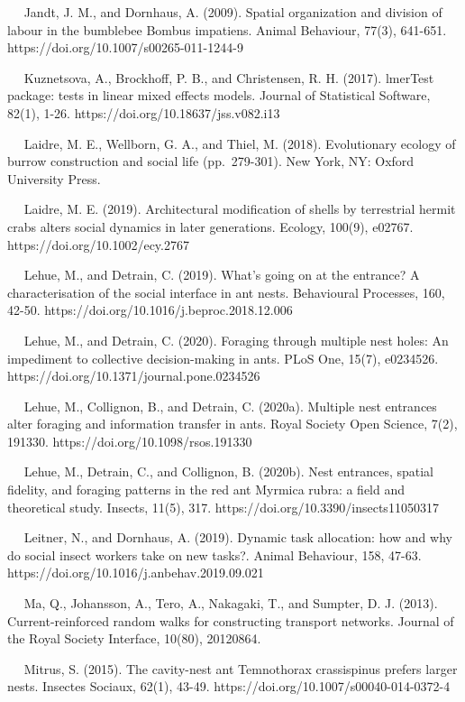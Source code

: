 \documentclass[3p]{elsarticle} %
\begin{document}
~~ Jandt, J. M., and Dornhaus, A. (2009). Spatial organization and
division of labour in the bumblebee Bombus impatiens. Animal Behaviour,
77(3), 641-651. https://doi.org/10.1007/s00265-011-1244-9

~~ Kuznetsova, A., Brockhoff, P. B., and Christensen, R. H. (2017).
lmerTest package: tests in linear mixed effects models. Journal of
Statistical Software, 82(1), 1-26. https://doi.org/10.18637/jss.v082.i13

~~ Laidre, M. E., Wellborn, G. A., and Thiel, M. (2018). Evolutionary
ecology of burrow construction and social life (pp.~279-301). New York,
NY: Oxford University Press.

~~ Laidre, M. E. (2019). Architectural modification of shells by
terrestrial hermit crabs alters social dynamics in later generations.
Ecology, 100(9), e02767. https://doi.org/10.1002/ecy.2767

~~ Lehue, M., and Detrain, C. (2019). What's going on at the entrance? A
characterisation of the social interface in ant nests. Behavioural
Processes, 160, 42-50. https://doi.org/10.1016/j.beproc.2018.12.006

~~ Lehue, M., and Detrain, C. (2020). Foraging through multiple nest
holes: An impediment to collective decision-making in ants. PLoS One,
15(7), e0234526. https://doi.org/10.1371/journal.pone.0234526

~~ Lehue, M., Collignon, B., and Detrain, C. (2020a). Multiple nest
entrances alter foraging and information transfer in ants. Royal Society
Open Science, 7(2), 191330. https://doi.org/10.1098/rsos.191330

~~ Lehue, M., Detrain, C., and Collignon, B. (2020b). Nest entrances,
spatial fidelity, and foraging patterns in the red ant Myrmica rubra: a
field and theoretical study. Insects, 11(5), 317.
https://doi.org/10.3390/insects11050317

~~ Leitner, N., and Dornhaus, A. (2019). Dynamic task allocation: how
and why do social insect workers take on new tasks?. Animal Behaviour,
158, 47-63. https://doi.org/10.1016/j.anbehav.2019.09.021

~~ Ma, Q., Johansson, A., Tero, A., Nakagaki, T., and Sumpter, D. J.
(2013). Current-reinforced random walks for constructing transport
networks. Journal of the Royal Society Interface, 10(80), 20120864.

~~ Mitrus, S. (2015). The cavity-nest ant Temnothorax crassispinus
prefers larger nests. Insectes Sociaux, 62(1), 43-49.
https://doi.org/10.1007/s00040-014-0372-4
\end{document}
